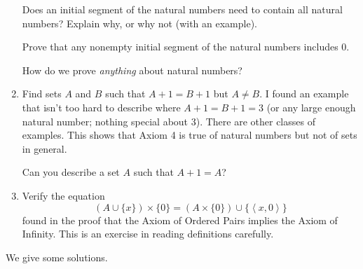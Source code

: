 \documentclass[12pt]{book}
\begin{document}
\begin{enumerate}
Does an initial segment of the natural numbers need to contain all
natural numbers?  Explain why, or why not (with an example).

Prove that any nonempty initial segment of the natural numbers includes 0.

How do we prove {\em anything\/} about natural numbers?

\item
Find sets $A$ and $B$ such that $A+1=B+1$ but $A \neq B$.  I found an
example that isn't too hard to describe where $A+1 = B+1 = 3$ (or any
large enough natural number; nothing special about 3).  There are
other classes of examples.  This shows that Axiom 4 is true of natural
numbers but not of sets in general.

Can you describe a set $A$ such that $A+1=A$?

\item Verify the equation $$(A \cup
\{x\}) \times \{0\} = (A \times\{0\}) \cup \{\left<x,0\right>\}$$ found in the proof that the Axiom of Ordered Pairs implies the Axiom of Infinity.  This is an exercise in reading definitions carefully.

\end{enumerate}

\newpage

We give some solutions.
\end{document}
